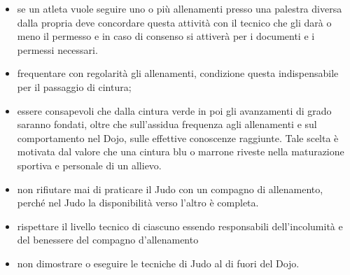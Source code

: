 \documentclass{djtsasddoc}
\begin{document}
\begin{enumerate}
\begin{itemize}
			\item se un atleta vuole seguire uno o più allenamenti presso una palestra diversa dalla propria deve concordare questa attività con il tecnico che gli darà o meno il permesso e in caso di consenso si attiverà per i documenti e i permessi necessari. 
			\item frequentare con regolarità gli allenamenti, condizione questa indispensabile per il passaggio di cintura;
			\item essere consapevoli che dalla cintura verde in poi gli avanzamenti di grado saranno fondati,  oltre che sull'assidua frequenza agli allenamenti e sul comportamento nel Dojo, sulle effettive conoscenze raggiunte. Tale scelta è motivata dal valore che una cintura blu o marrone riveste nella maturazione sportiva e personale di un allievo.
			\item non rifiutare mai di praticare il Judo con un compagno di allenamento, perché nel Judo la disponibilità verso l’altro è completa. 
			\item rispettare il livello tecnico di ciascuno essendo responsabili dell’incolumità e del benessere del compagno d’allenamento
			\item non dimostrare o eseguire le tecniche di Judo al di fuori del Dojo.
		\end{itemize}
	\end{enumerate}
	
\end{document}
